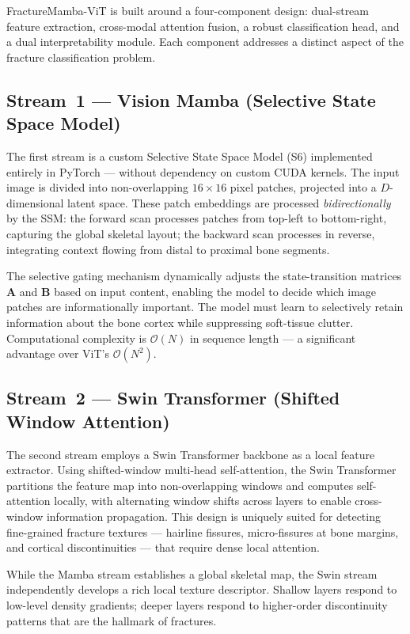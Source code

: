 \documentclass[12pt, a4paper]{article}
\begin{document}
FractureMamba-ViT is built around a four-component design: dual-stream feature extraction,
cross-modal attention fusion, a robust classification head, and a dual interpretability module.
Each component addresses a distinct aspect of the fracture classification problem.

\subsection{Stream~1 — Vision Mamba (Selective State Space Model)}

The first stream is a custom Selective State Space Model (S6) implemented entirely in PyTorch —
without dependency on custom CUDA kernels. The input image is divided into non-overlapping
$16\times16$ pixel patches, projected into a $D$-dimensional latent space. These patch embeddings
are processed \emph{bidirectionally} by the SSM: the forward scan processes patches from
top-left to bottom-right, capturing the global skeletal layout; the backward scan processes in
reverse, integrating context flowing from distal to proximal bone segments.

The selective gating mechanism dynamically adjusts the state-transition matrices $\mathbf{A}$ and
$\mathbf{B}$ based on input content, enabling the model to decide which image patches are
informationally important. The model must learn to selectively retain information about the bone
cortex while suppressing soft-tissue clutter. Computational complexity is $\mathcal{O}(N)$ in
sequence length — a significant advantage over ViT's $\mathcal{O}(N^2)$.

\subsection{Stream~2 — Swin Transformer (Shifted Window Attention)}

The second stream employs a Swin Transformer backbone as a local feature extractor. Using
shifted-window multi-head self-attention, the Swin Transformer partitions the feature map into
non-overlapping windows and computes self-attention locally, with alternating window shifts
across layers to enable cross-window information propagation. This design is uniquely suited for
detecting fine-grained fracture textures — hairline fissures, micro-fissures at bone margins,
and cortical discontinuities — that require dense local attention.

While the Mamba stream establishes a global skeletal map, the Swin stream independently develops
a rich local texture descriptor. Shallow layers respond to low-level density gradients; deeper
layers respond to higher-order discontinuity patterns that are the hallmark of fractures.
\end{document}
